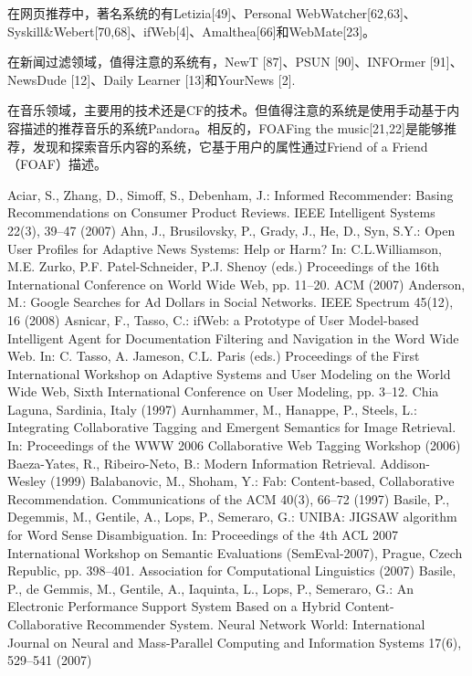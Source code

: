 在网页推荐中，著名系统的有Letizia[49]、Personal WebWatcher[62,63]、Syskill&Webert[70,68]、ifWeb[4]、Amalthea[66]和WebMate[23]。

在新闻过滤领域，值得注意的系统有，NewT [87]、PSUN [90]、INFOrmer [91]、NewsDude [12]、Daily Learner [13]和YourNews [2].

在音乐领域，主要用的技术还是CF的技术。但值得注意的系统是使用手动基于内容描述的推荐音乐的系统Pandora。相反的，FOAFing the music[21,22]是能够推荐，发现和探索音乐内容的系统，它基于用户的属性通过Friend of a Friend（FOAF）描述。





\begin{thebibliography}{110}
Aciar, S., Zhang, D., Simoff, S., Debenham, J.: Informed Recommender: Basing Recommendations on Consumer Product Reviews. IEEE Intelligent Systems 22(3), 39–47 (2007)
Ahn, J., Brusilovsky, P., Grady, J., He, D., Syn, S.Y.: Open User Profiles for Adaptive News Systems: Help or Harm? In: C.L.Williamson, M.E. Zurko, P.F. Patel-Schneider, P.J. Shenoy (eds.) Proceedings of the 16th International Conference on World Wide Web, pp. 11–20. ACM (2007)
Anderson, M.: Google Searches for Ad Dollars in Social Networks. IEEE Spectrum 45(12), 16 (2008)
Asnicar, F., Tasso, C.: ifWeb: a Prototype of User Model-based Intelligent Agent for Documentation Filtering and Navigation in the Word Wide Web. In: C. Tasso, A. Jameson, C.L. Paris (eds.) Proceedings of the First International Workshop on Adaptive Systems and User Modeling on the World Wide Web, Sixth International Conference on User Modeling, pp. 3–12. Chia Laguna, Sardinia, Italy (1997)
Aurnhammer, M., Hanappe, P., Steels, L.: Integrating Collaborative Tagging and Emergent Semantics for Image Retrieval. In: Proceedings of the WWW 2006 Collaborative Web Tagging Workshop (2006)
Baeza-Yates, R., Ribeiro-Neto, B.: Modern Information Retrieval. Addison-Wesley (1999)
Balabanovic, M., Shoham, Y.: Fab: Content-based, Collaborative Recommendation. Communications of the ACM 40(3), 66–72 (1997)
Basile, P., Degemmis, M., Gentile, A., Lops, P., Semeraro, G.: UNIBA: JIGSAW algorithm for Word Sense Disambiguation. In: Proceedings of the 4th ACL 2007 International Workshop on Semantic Evaluations (SemEval-2007), Prague, Czech Republic, pp. 398–401. Association for Computational Linguistics (2007)
Basile, P., de Gemmis, M., Gentile, A., Iaquinta, L., Lops, P., Semeraro, G.: An Electronic Performance Support System Based on a Hybrid Content-Collaborative Recommender System. Neural Network World: International Journal on Neural and Mass-Parallel Computing and Information Systems 17(6), 529–541 (2007)

\end{thebibliography}

